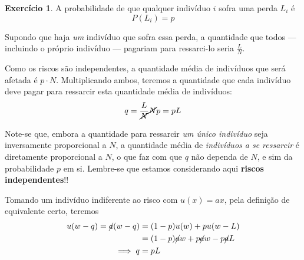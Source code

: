 \documentclass[12pt]{article}
\numberwithin{equation}{section}
\theoremstyle{plain}
\theoremstyle{definition}
\newtheorem{exercise}{Exercício}
\theoremstyle{remark}
\begin{document}
\begin{exercise}
A probabilidade de que qualquer indivíduo \(i\) sofra uma perda
\(L_{i}\) é
\[
P(L_{i}) = p
\]

Supondo que haja \textit{um} indivíduo que sofra essa perda, a
quantidade que todos --- incluindo o próprio indivíduo --- pagariam para
ressarci-lo seria \(\frac{L}{N}\).

Como os riscos são independentes, a quantidade média de indivíduos que
será afetada é \(p\cdot N\). Multiplicando ambos, teremos a quantidade
que cada indivíduo deve pagar para ressarcir esta quantidade média de
indivíduos:
\[
q=\frac{L}{\cancel{ N }} \cancel{ N } p = pL
\]

Note-se que, embora a quantidade para ressarcir \textit{um único
indivíduo} seja inversamente proporcional a \(N\), a quantidade média de
\textit{indivíduos a se ressarcir} é diretamente proporcional a \(N\), o
que faz com que \(q\) não dependa de \(N\), e sim da probabilidade \(p\)
em si. Lembre-se que estamos considerando aqui \textbf{riscos
independentes}!!

Tomando um indivíduo indiferente ao risco com \(u(x)=ax\), pela
definição de equivalente certo, teremos \begin{align*}
u(w-q) = \cancel{ a }(w-q) &= (1-p)u(w) + p u(w-L) \\
&= (1-p) \cancel{ a }w + p \cancel{ a }w - p \cancel{ a }L \\
\implies q &= pL
\end{align*}
\end{exercise}
\end{document}
